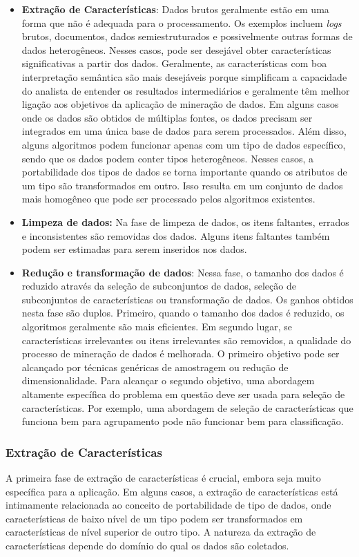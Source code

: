 \begin{itemize}
  \item
\textbf{Extração de Características}: Dados brutos geralmente estão em uma forma que não é adequada para o processamento. Os exemplos incluem \textit{logs} brutos, documentos, dados semiestruturados e possivelmente outras formas de dados heterogêneos. Nesses casos, pode ser desejável obter características significativas a partir dos dados. Geralmente, as características com boa interpretação semântica são mais desejáveis porque simplificam a capacidade do analista de entender os resultados intermediários e geralmente têm melhor ligação aos objetivos da aplicação de mineração de dados. Em alguns casos onde os dados são obtidos de múltiplas fontes, os dados precisam ser integrados em uma única base de dados para serem processados. Além disso, alguns algoritmos podem funcionar apenas com um tipo de dados específico, sendo que os dados podem conter tipos heterogêneos. Nesses casos, a portabilidade dos tipos de dados se torna importante quando os atributos de um tipo são transformados em outro. Isso resulta em um conjunto de dados mais homogêneo que pode ser processado pelos algoritmos existentes.
  \item
\textbf{Limpeza de dados:} Na fase de limpeza de dados, os itens faltantes, errados e inconsistentes são removidas dos dados. Alguns itens faltantes também podem ser estimadas para serem inseridos nos dados.
  \item
\textbf{Redução e transformação de dados}: Nessa fase, o tamanho dos dados é reduzido através da seleção de subconjuntos de dados, seleção de subconjuntos de características ou transformação de dados. Os ganhos obtidos nesta fase são duplos. Primeiro, quando o tamanho dos dados é reduzido, os algoritmos geralmente são mais eficientes. Em segundo lugar, se características irrelevantes ou itens irrelevantes são removidos, a qualidade do processo de mineração de dados é melhorada. O primeiro objetivo pode ser alcançado por técnicas genéricas de amostragem ou redução de dimensionalidade. Para alcançar o segundo objetivo, uma abordagem altamente específica do problema em questão deve ser usada para seleção de características. Por exemplo, uma abordagem de seleção de características que funciona bem para agrupamento pode não funcionar bem para classificação.
\end{itemize}

\subsubsection{Extração de Características}
A primeira fase de extração de características é crucial, embora seja muito específica para a aplicação. Em alguns casos, a extração de características está intimamente relacionada ao conceito de portabilidade de tipo de dados, onde características de baixo nível de um tipo podem ser transformados em características de nível superior de outro tipo. A natureza da extração de características depende do domínio do qual os dados são coletados.

